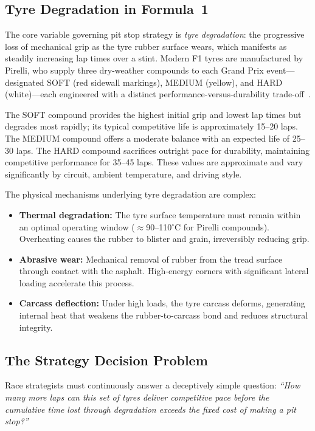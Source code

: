 \documentclass[journal,twoside]{IEEEtran}
\begin{document}
\subsection{Tyre Degradation in Formula~1}

The core variable governing pit stop strategy is \emph{tyre
degradation}: the progressive loss of mechanical grip as the tyre rubber
surface wears, which manifests as steadily increasing lap times over a
stint.  Modern F1 tyres are manufactured by Pirelli, who supply three
dry-weather compounds to each Grand Prix event---designated SOFT (red
sidewall markings), MEDIUM (yellow), and HARD (white)---each engineered
with a distinct performance-versus-durability trade-off~\cite{pirelli2023}.

The SOFT compound provides the highest initial grip and lowest lap
times but degrades most rapidly; its typical competitive life is
approximately 15--20 laps.  The MEDIUM compound offers a moderate
balance with an expected life of 25--30 laps.  The HARD compound
sacrifices outright pace for durability, maintaining competitive
performance for 35--45 laps.  These values are approximate and vary
significantly by circuit, ambient temperature, and driving style.

The physical mechanisms underlying tyre degradation are complex:
\begin{itemize}[noitemsep]
  \item \textbf{Thermal degradation:}  The tyre surface temperature
        must remain within an optimal operating window
        ($\approx$90--110$^{\circ}$C for Pirelli compounds).
        Overheating causes the rubber to blister and grain, irreversibly
        reducing grip.
  \item \textbf{Abrasive wear:}  Mechanical removal of rubber from the
        tread surface through contact with the asphalt.  High-energy
        corners with significant lateral loading accelerate this
        process.
  \item \textbf{Carcass deflection:}  Under high loads, the tyre
        carcass deforms, generating internal heat that weakens the
        rubber-to-carcass bond and reduces structural integrity.
\end{itemize}

\subsection{The Strategy Decision Problem}

Race strategists must continuously answer a deceptively simple
question: \emph{``How many more laps can this set of tyres deliver
competitive pace before the cumulative time lost through degradation
exceeds the fixed cost of making a pit stop?''}
\end{document}
